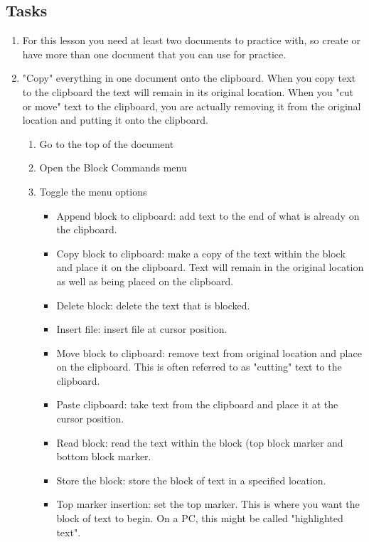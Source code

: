 \documentclass[10pt,letterpaper,twoside]{report}
\begin{document}
{\subsection{Tasks}
\begin{enumerate}
	\item For this lesson you need at least two documents to practice with, so create or have more than one document that you can use for practice.
	\item "Copy" everything in one document onto the clipboard. When you copy text to the clipboard the text will remain in its original location. When you "cut or move" text to the clipboard, you are actually removing it from the original location and putting it onto the clipboard.
	      \begin{enumerate}
		      \item Go to the top of the document 
		      \item Open the Block Commands menu 
		      \item Toggle the menu options 
		            \begin{itemize}
			            \item Append block to clipboard: add text to the end of what is already on the clipboard.
			            \item Copy block to clipboard: make a copy of the text within the block and place it on the clipboard. Text will remain in the original location as well as being placed on the clipboard.
			            \item Delete block: delete the text that is blocked.
			            \item Insert file: insert file at cursor position.
			            \item Move block to clipboard: remove text from original location and place on the clipboard. This is often referred to as "cutting" text to the clipboard.
			            \item Paste clipboard: take text from the clipboard and place it at the cursor position.
			            \item Read block: read the text within the block (top block marker and bottom block marker.
			            \item Store the block: store the block of text in a specified location.
			            \item Top marker insertion: set the top marker. This is where you want the block of text to begin. On a PC, this might be called "highlighted text".

\end{itemize}
\end{enumerate}
\end{enumerate}}
\end{document}
